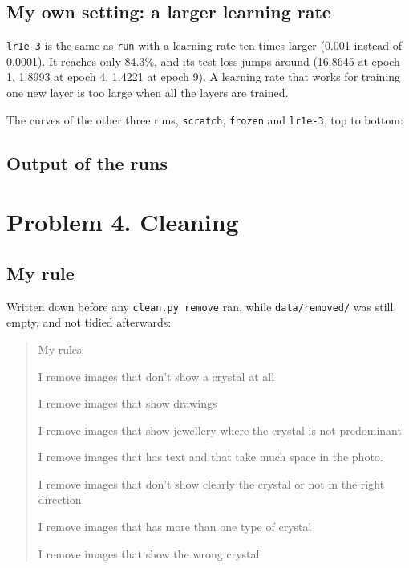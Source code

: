 \documentclass[11pt]{article}
\begin{document}
\subsection*{My own setting: a larger learning rate}

\texttt{lr1e-3} is the same as \texttt{run} with a learning rate ten times
larger (0.001 instead of 0.0001). It reaches only 84.3\%, and its test loss jumps
around (16.8645 at epoch 1, 1.8993 at epoch 4, 1.4221 at epoch 9). A learning rate
that works for training one new layer is too large when all the layers are
trained.

The curves of the other three runs, \texttt{scratch}, \texttt{frozen} and
\texttt{lr1e-3}, top to bottom:


\subsection*{Output of the runs}

\section*{Problem 4. Cleaning}

\subsection*{My rule}
Written down before any \texttt{clean.py remove} ran, while
\texttt{data/removed/} was still empty, and not tidied afterwards:

\begin{quote}
My rules:

I remove images that don't show a crystal at all

I remove images that show drawings

I remove images that show jewellery where the crystal is not predominant

I remove images that has text and that take much space in the photo.

I remove images that don't show clearly the crystal or not in the right
direction.

I remove images that has more than one type of crystal

I remove images that show the wrong crystal.
\end{quote}
\end{document}
